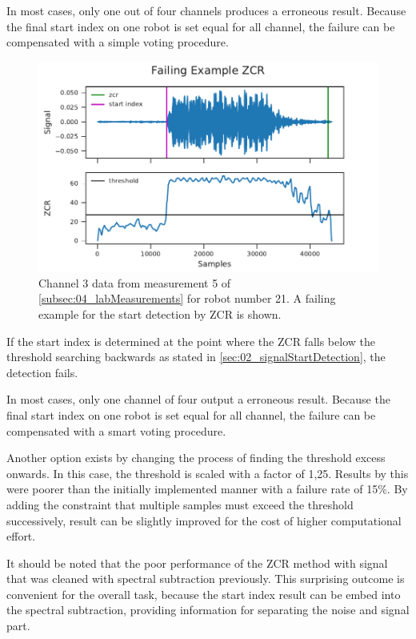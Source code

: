 In most cases, only one out of four channels produces a erroneous
result.
Because the final start index on one robot is set equal for all channel,
the failure can be compensated with a simple voting procedure.
\begin{figure}[ht]
	\centering
	\includegraphics[]{figures/evaluation/zcr_fail}
	\caption{Channel 3 data from measurement 5 of \cref{subsec:04_labMeasurements}
		for robot number 21. A failing example for the start detection by \ac{ZCR}
		is shown.}
	\label{fig:04_zcrFail}
\end{figure}
If the start index is determined at the point where the \ac{ZCR}
falls below the threshold searching backwards as stated in \cref{sec:02_signalStartDetection},
the detection fails.

In most cases, only one channel of four output a erroneous result.
Because the final start index on one robot is set equal for all channel,
the failure can be compensated with a smart voting procedure.

Another option exists by changing the process of finding the
threshold excess onwards.
In this case, the threshold is scaled with a factor of 1,25.
Results by this were poorer than the initially implemented manner
with a failure rate of 15\si{\percent}.
By adding the constraint that multiple samples must exceed the
threshold successively, result can be slightly improved for the cost of higher
computational effort.

It should be noted that the poor performance of the \ac{ZCR} method with signal that
was cleaned with spectral subtraction previously. This surprising outcome is
convenient for the overall task, because the start index result can be embed
into the spectral subtraction, providing information for separating the noise
and signal part.

